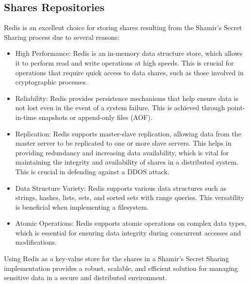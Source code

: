 \documentclass{tufte-handout}
\begin{document}
\subsection{Shares Repositories}
Redis is an excellent choice for storing shares resulting from the Shamir's Secret Sharing process due to several reasons:
\begin{itemize}
  \item High Performance: Redis is an in-memory data structure store, which allows it to perform read and write operations at high speeds.
  This is crucial for operations that require quick access to data shares, such as those involved in cryptographic processes.
  \item Reliability: Redis provides persistence mechanisms that help ensure data is not lost even in the event of a system failure.
  This is achieved through point-in-time snapshots or append-only files (AOF).
  \item Replication: Redis supports master-slave replication, allowing data from the master server to be replicated to one or more slave
  servers. This helps in providing redundancy and increasing data availability, which is vital for maintaining the integrity and availability
  of shares in a distributed system. This is crucial in defending against a DDOS attack.
  \item Data Structure Variety: Redis supports various data structures such as strings, hashes, lists, sets, and sorted sets with range
  queries. This versatility is beneficial when implementing a filesystem.
  \item Atomic Operations: Redis supports atomic operations on complex data types, which is essential for ensuring data integrity
  during concurrent accesses and modifications.
\end{itemize}
Using Redis as a key-value store for the shares in a Shamir's Secret Sharing implementation provides a robust, scalable, and efficient
solution for managing sensitive data in a secure and distributed environment.
\end{document}
